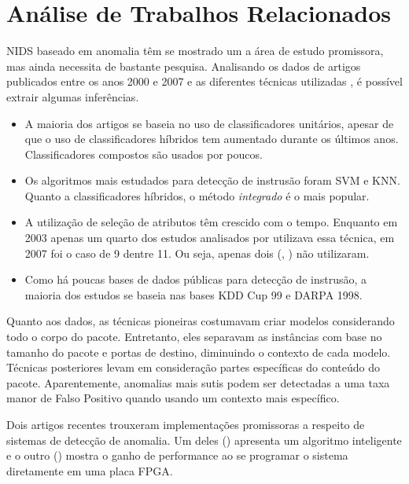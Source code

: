 \chapter{Análise de Trabalhos Relacionados}
\label{ch:analise}

NIDS baseado em anomalia têm se mostrado um a área de estudo promissora, mas ainda necessita de bastante pesquisa.
Analisando os dados de artigos publicados entre os anos 2000 e 2007 e as diferentes técnicas utilizadas \cite{tsai09},
é possível extrair algumas inferências.
\begin{itemize}
    \item  A maioria dos artigos se baseia no uso de classificadores unitários, apesar de que o uso de
    classificadores híbridos tem aumentado durante os últimos anos. Classificadores compostos são usados por poucos.

    \item Os algoritmos mais estudados para detecção de instrusão foram SVM e KNN. Quanto a classificadores híbridos,
    o método \textit{integrado} é o mais popular.

    \item A utilização de seleção de atributos têm crescido com o tempo. Enquanto em 2003 apenas um quarto dos estudos analisados
por \cite{tsai09} utilizava essa técnica, em 2007 foi o caso de 9 dentre 11. Ou seja, apenas dois
(\cite{peddabachigari07}, \cite{li07}) não utilizaram.

    \item Como há poucas bases de dados públicas para detecção de instrusão, a maioria dos estudos se baseia nas
    bases KDD Cup 99 e DARPA 1998.
\end{itemize}

\par Quanto aos dados, as técnicas pioneiras costumavam criar modelos considerando todo o corpo do pacote. Entretanto,
eles separavam as instâncias com base no tamanho do pacote e portas de destino, diminuindo o contexto de cada modelo.
Técnicas posteriores levam em consideração partes específicas do conteúdo do pacote. Aparentemente, anomalias mais
sutis podem ser detectadas a uma taxa manor de Falso Positivo quando usando um contexto mais específico.
\par Dois artigos recentes trouxeram implementações promissoras a respeito de sistemas de detecção de
anomalia. Um deles (\cite{lin12}) apresenta um algoritmo inteligente e o outro (\cite{papadonikolakis12}) mostra o
ganho de performance ao se programar o sistema diretamente em uma placa FPGA.

